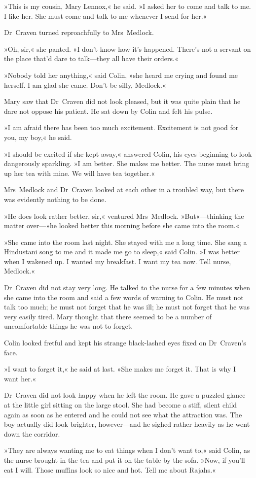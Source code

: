 »This is my cousin, Mary Lennox,« he said. »I asked her to come and talk to me. I like her. She must come and talk to me whenever I send for her.«

Dr~Craven turned reproachfully to Mrs~Medlock.

»Oh, sir,« she panted. »I don't know how it's happened. There's not a servant on the place that'd dare to talk—they all have their orders.«

»Nobody told her anything,« said Colin, »she heard me crying and found me herself. I am glad she came. Don't be silly, Medlock.«

Mary saw that Dr~Craven did not look pleased, but it was quite plain that he dare not oppose his patient. He sat down by Colin and felt his pulse.

»I am afraid there has been too much excitement. Excitement is not good for you, my boy,« he said.

»I should be excited if she kept away,« answered Colin, his eyes beginning to look dangerously sparkling. »I am better. She makes me better. The nurse must bring up her tea with mine. We will have tea together.«

Mrs~Medlock and Dr~Craven looked at each other in a troubled way, but there was evidently nothing to be done.

»He does look rather better, sir,« ventured Mrs~Medlock. »But«—thinking the matter over—»he looked better this morning before she came into the room.«

»She came into the room last night. She stayed with me a long time. She sang a Hindustani song to me and it made me go to sleep,« said Colin. »I was better when I wakened up. I wanted my breakfast. I want my tea now. Tell nurse, Medlock.«

Dr~Craven did not stay very long. He talked to the nurse for a few minutes when she came into the room and said a few words of warning to Colin. He must not talk too much; he must not forget that he was ill; he must not forget that he was very easily tired. Mary thought that there seemed to be a number of uncomfortable things he was not to forget.

Colin looked fretful and kept his strange black-lashed eyes fixed on Dr~Craven's face.

»I want to forget it,« he said at last. »She makes me forget it. That is why I want her.«

Dr~Craven did not look happy when he left the room. He gave a puzzled glance at the little girl sitting on the large stool. She had become a stiff, silent child again as soon as he entered and he could not see what the attraction was. The boy actually did look brighter, however—and he sighed rather heavily as he went down the corridor.

»They are always wanting me to eat things when I don't want to,« said Colin, as the nurse brought in the tea and put it on the table by the sofa. »Now, if you'll eat I will. Those muffins look so nice and hot. Tell me about Rajahs.«